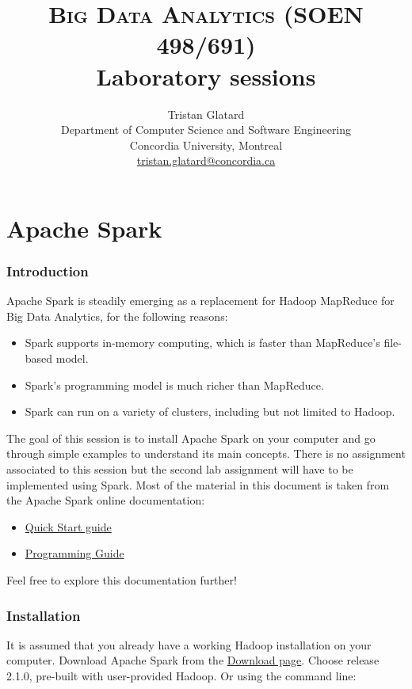 \documentclass[11pt]{article}
\title{\textsc{Big Data Analytics (SOEN 498/691)} \\ Laboratory sessions}
\author{Tristan Glatard\\Department of Computer Science and Software Engineering\\Concordia University, Montreal\\\href{mailto:tristan.glatard@concordia.ca}{tristan.glatard@concordia.ca}}
\begin{document}
\maketitle

\newpage

\tableofcontents

\newpage

\part{Apache Spark}

\section{Introduction}

Apache Spark is steadily emerging as a replacement for Hadoop
MapReduce for Big Data Analytics, for the following reasons:
\begin{itemize}
\item Spark supports in-memory computing, which is faster
  than MapReduce's file-based model.
\item Spark's programming model is much richer than
  MapReduce.
  \item Spark can run on a variety of clusters, including but not
    limited to Hadoop.
\end{itemize}

The goal of this session is to install Apache Spark on your computer
and go through simple examples to understand its main concepts. There
is no assignment associated to this session but the second lab
assignment will have to be implemented using Spark.  Most of the
material in this document is taken from the Apache Spark online
documentation:
\begin{itemize}
\item  \href{http://spark.apache.org/docs/latest/quick-start.html}{Quick Start guide}
\item \href{http://spark.apache.org/docs/latest/programming-guide.html}{Programming Guide}
\end{itemize}
Feel free to explore this documentation further!

\section{Installation}

It is assumed that you already have a working Hadoop installation on
your computer. Download Apache Spark from the
\href{http://spark.apache.org/downloads.html}{Download page}. Choose
release 2.1.0, pre-built with user-provided Hadoop. Or using the
command line:
\end{document}
